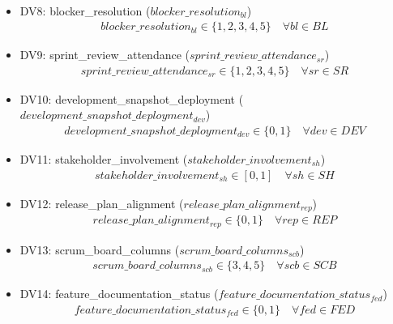 \documentclass{article}
\begin{document}
\begin{itemize}
\begin{align*}
        \end{align*}
    \item DV8: blocker\_resolution ($blocker\_resolution_{bl}$)
        \begin{align*}
            blocker\_resolution_{bl} \in \{1, 2, 3, 4, 5\} \quad \forall bl \in BL
        \end{align*}
    \item DV9: sprint\_review\_attendance ($sprint\_review\_attendance_{sr}$)
        \begin{align*}
            sprint\_review\_attendance_{sr} \in \{1, 2, 3, 4, 5\} \quad \forall sr \in SR
        \end{align*}
    \item DV10: development\_snapshot\_deployment ($development\_snapshot\_deployment_{dev}$)
        \begin{align*}
            development\_snapshot\_deployment_{dev} \in \{0, 1\} \quad \forall dev \in DEV
        \end{align*}
    \item DV11: stakeholder\_involvement ($stakeholder\_involvement_{sh}$)
        \begin{align*}
            stakeholder\_involvement_{sh} \in [0, 1] \quad \forall sh \in SH
        \end{align*}
    \item DV12: release\_plan\_alignment ($release\_plan\_alignment_{rep}$)
        \begin{align*}
            release\_plan\_alignment_{rep} \in \{0, 1\} \quad \forall rep \in REP
        \end{align*}
    \item DV13: scrum\_board\_columns ($scrum\_board\_columns_{scb}$)
        \begin{align*}
            scrum\_board\_columns_{scb} \in \{3, 4, 5\} \quad \forall scb \in SCB
        \end{align*}
    \item DV14: feature\_documentation\_status ($feature\_documentation\_status_{fed}$)
        \begin{align*}
            feature\_documentation\_status_{fed} \in \{0, 1\} \quad \forall fed \in FED
        \end{align*}
\end{itemize}
\end{document}

